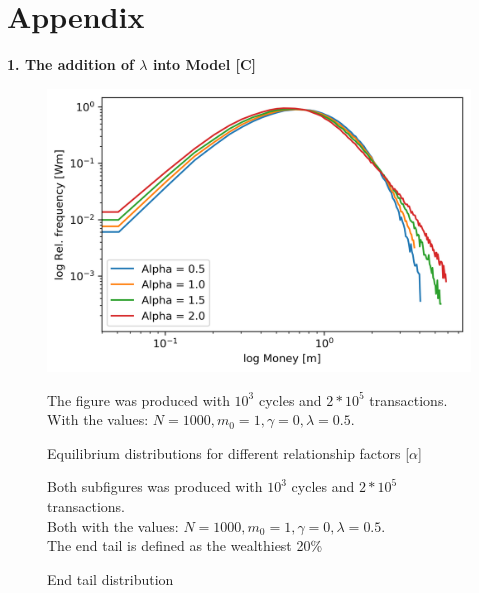 \documentclass[a4paper,11pt]{article}
\begin{document}
\section{Appendix}

\textbf{1. The addition of $\lambda$ into Model [C]}
\begin{figure}[H]
	\includegraphics[scale=1]{figures/relationship_save_1000c_200000t.png} 
	\caption{Equilibrium distributions for different relationship factors [$\alpha$]}
{\small The figure was produced with $10^3$ cycles and $2*10^5$ transactions. \\With the values: $N = 1000, m_0 = 1, \gamma = 0, \lambda = 0.5$. }
\end{figure}

\begin{figure}[H]
  \hfill
  \caption{End tail distribution}
{\small Both subfigures was produced with $10^3$ cycles and $2*10^5$ transactions. \\Both with the values: $N = 1000, m_0 = 1, \gamma = 0, \lambda = 0.5$. \\The end tail is defined as the wealthiest 20\% }
\end{figure}
\end{document}
